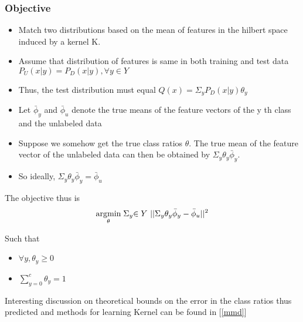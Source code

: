 \subsubsection{Objective}
\begin{itemize}
  \item Match two distributions based on the mean of features in the hilbert space induced by a kernel K. \medskip
  \item Assume that distribution of features is same in both training and test data
    $P_U (x|y) = P_D (x|y), \forall y \in Y$ \medskip
  \item Thus, the test distribution must equal $Q(x) = \Sigma_{y} P_D (x|y)\theta_y$  \medskip
 \end{itemize}
 
 \begin{itemize}
  \item Let $\bar{\phi}_y$ and $\bar{\phi}_u$ denote the true means of the feature vectors of the y th class and the
unlabeled data \medskip
  \item Suppose we somehow get the true class ratios ${\theta}$. The true mean of the feature vector of the
  unlabeled data can then be obtained by $\Sigma_y\theta_y\bar{\phi}_y$. \medskip
  \item So ideally, $\Sigma_y\theta_y\bar{\phi}_y = \bar{\phi}_u$ \medskip
 \end{itemize}
 The objective thus is
  \begin{equation}
  \underset{\theta}{\operatorname{arg}\!\operatorname{min}}\;\Sigma_y{ \in Y\text{  } }|| \Sigma_y\theta_y\bar{\phi}_y - \bar{\phi}_u || ^ {2}  
  \end{equation}
  \begin{center}
  Such that 
  \begin{itemize}
   \item \begin{center} $\forall y, \theta_y \geq 0$ \end{center}
  \item \begin{center} $\sum_{y = 0}^c \theta_y = 1$ \end{center} 
  \end{itemize}
  \end{center}
  

Interesting discussion on theoretical bounds on the error in the class ratios thus predicted and
methods for learning Kernel can be found in [\ref{mmd}]

